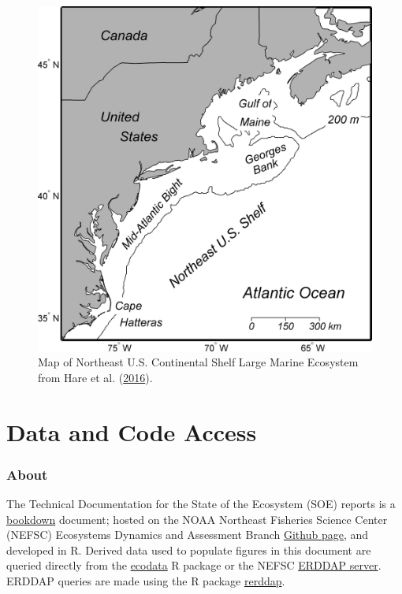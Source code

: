 \documentclass[
]{book}
\begin{document}
\begin{figure}

{\centering \includegraphics[width=34.64in]{images/journal.pone.0146756.g002} 

}

\caption{Map of Northeast U.S. Continental Shelf Large Marine Ecosystem from Hare et al. (\protect\hyperlink{ref-Hare2016}{2016}).}\label{fig:neusmap}
\end{figure}

\hypertarget{erddap}{%
\chapter{Data and Code Access}\label{erddap}}

\hypertarget{about}{%
\subsection{About}\label{about}}

The Technical Documentation for the State of the Ecosystem (SOE) reports is a \href{https://bookdown.org}{bookdown} document; hosted on the NOAA Northeast Fisheries Science Center (NEFSC) Ecosystems Dynamics and Assessment Branch \href{https://github.com/NOAA-EDAB}{Github page}, and developed in R. Derived data used to populate figures in this document are queried directly from the \href{https://github.com/NOAA-EDAB/ecodata}{ecodata} R package or the NEFSC \href{https://comet.nefsc.noaa.gov/erddap/info/index.html?page=1\&itemsPerPage=1000}{ERDDAP server}. ERDDAP queries are made using the R package \href{https://cran.r-project.org/web/packages/rerddap/vignettes/Using_rerddap.html}{rerddap}.
\end{document}

